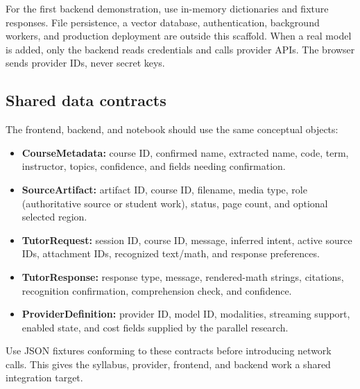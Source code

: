 \documentclass[11pt]{article}
\begin{document}
For the first backend demonstration, use in-memory dictionaries and fixture responses. File persistence, a vector database, authentication, background workers, and production deployment are outside this scaffold. When a real model is added, only the backend reads credentials and calls provider APIs. The browser sends provider IDs, never secret keys.

\subsection{Shared data contracts}
The frontend, backend, and notebook should use the same conceptual objects:
\begin{itemize}
\item \textbf{CourseMetadata:} course ID, confirmed name, extracted name, code, term, instructor, topics, confidence, and fields needing confirmation.
\item \textbf{SourceArtifact:} artifact ID, course ID, filename, media type, role (authoritative source or student work), status, page count, and optional selected region.
\item \textbf{TutorRequest:} session ID, course ID, message, inferred intent, active source IDs, attachment IDs, recognized text/math, and response preferences.
\item \textbf{TutorResponse:} response type, message, rendered-math strings, citations, recognition confirmation, comprehension check, and confidence.
\item \textbf{ProviderDefinition:} provider ID, model ID, modalities, streaming support, enabled state, and cost fields supplied by the parallel research.
\end{itemize}

Use JSON fixtures conforming to these contracts before introducing network calls. This gives the syllabus, provider, frontend, and backend work a shared integration target.
\end{document}
